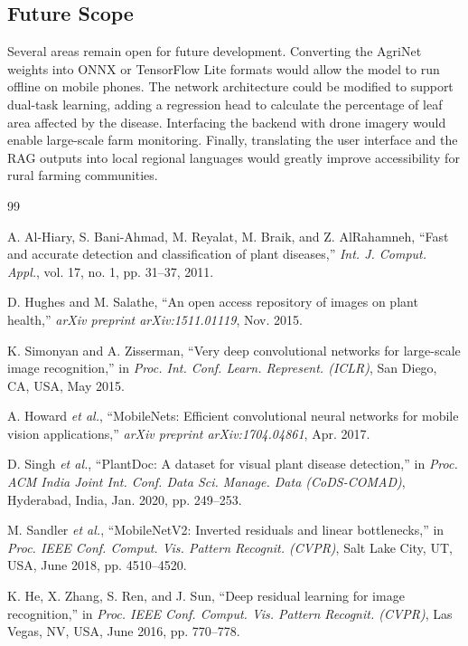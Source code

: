 \documentclass[12pt, a4paper]{report}
\begin{document}
\subsection{Future Scope}
Several areas remain open for future development. Converting the AgriNet weights into ONNX or TensorFlow Lite formats would allow the model to run offline on mobile phones. The network architecture could be modified to support dual-task learning, adding a regression head to calculate the percentage of leaf area affected by the disease. Interfacing the backend with drone imagery would enable large-scale farm monitoring. Finally, translating the user interface and the RAG outputs into local regional languages would greatly improve accessibility for rural farming communities.

\renewcommand{\bibname}{REFERENCES}
\begin{thebibliography}{99}

A. Al-Hiary, S. Bani-Ahmad, M. Reyalat, M. Braik, and Z. AlRahamneh, ``Fast and accurate detection and classification of plant diseases,'' \textit{Int. J. Comput. Appl.}, vol. 17, no. 1, pp. 31--37, 2011.

D. Hughes and M. Salathe, ``An open access repository of images on plant health,'' \textit{arXiv preprint arXiv:1511.01119}, Nov. 2015.

K. Simonyan and A. Zisserman, ``Very deep convolutional networks for large-scale image recognition,'' in \textit{Proc. Int. Conf. Learn. Represent. (ICLR)}, San Diego, CA, USA, May 2015.

A. Howard \textit{et al.}, ``MobileNets: Efficient convolutional neural networks for mobile vision applications,'' \textit{arXiv preprint arXiv:1704.04861}, Apr. 2017.

D. Singh \textit{et al.}, ``PlantDoc: A dataset for visual plant disease detection,'' in \textit{Proc. ACM India Joint Int. Conf. Data Sci. Manage. Data (CoDS-COMAD)}, Hyderabad, India, Jan. 2020, pp. 249--253.

M. Sandler \textit{et al.}, ``MobileNetV2: Inverted residuals and linear bottlenecks,'' in \textit{Proc. IEEE Conf. Comput. Vis. Pattern Recognit. (CVPR)}, Salt Lake City, UT, USA, June 2018, pp. 4510--4520.

K. He, X. Zhang, S. Ren, and J. Sun, ``Deep residual learning for image recognition,'' in \textit{Proc. IEEE Conf. Comput. Vis. Pattern Recognit. (CVPR)}, Las Vegas, NV, USA, June 2016, pp. 770--778.


\end{thebibliography}
\end{document}
